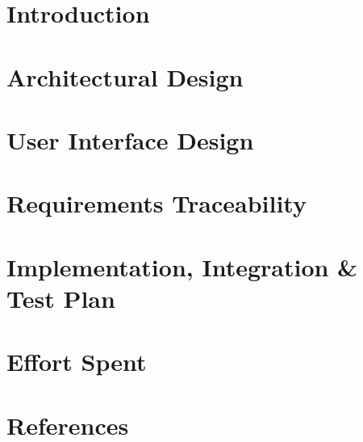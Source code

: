\newpage
{}
\tableofcontents
\newpage
{}
\listoffigures
\clearpage
{\section{Introduction}}
\label{sect:introduction}

\clearpage
{\section{Architectural Design}}
\label{sect:architectural}

\clearpage
{\section{User Interface Design}}
\label{sect:user interface}

\clearpage
{\section{Requirements Traceability}}
\label{sect:traceability}

\clearpage
{\section{Implementation, Integration \& Test Plan}}
\label{sect:implementation}

\clearpage
{\section{Effort Spent}}
\label{sect:effort}

\clearpage
{\section{References}}
\label{sect:references}

